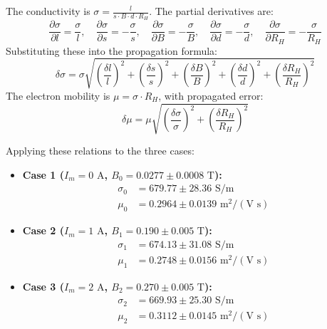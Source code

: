\documentclass[a4paper,11pt]{article}
\begin{document}
The conductivity is $\sigma = \frac{l}{s \cdot B \cdot d \cdot R_H}$. The partial derivatives are:
\begin{equation}
    \frac{\partial \sigma}{\partial l} = \frac{\sigma}{l}, \quad \frac{\partial \sigma}{\partial s} = -\frac{\sigma}{s}, \quad \frac{\partial \sigma}{\partial B} = -\frac{\sigma}{B}, \quad \frac{\partial \sigma}{\partial d} = -\frac{\sigma}{d}, \quad \frac{\partial \sigma}{\partial R_H} = -\frac{\sigma}{R_H}
\end{equation}
Substituting these into the propagation formula:
\begin{equation}
    \delta \sigma = \sigma \sqrt{\left(\frac{\delta l}{l}\right)^2 + \left(\frac{\delta s}{s}\right)^2 + \left(\frac{\delta B}{B}\right)^2 + \left(\frac{\delta d}{d}\right)^2 + \left(\frac{\delta R_H}{R_H}\right)^2}
\end{equation}
The electron mobility is $\mu = \sigma \cdot R_H$, with propagated error:
\begin{equation}
    \delta \mu = \mu \sqrt{\left(\frac{\delta \sigma}{\sigma}\right)^2 + \left(\frac{\delta R_H}{R_H}\right)^2}
\end{equation}

Applying these relations to the three cases:
\begin{itemize}
    \item {\bf Case 1 ($I_m = 0\text{ A}$, $B_0 = 0.0277 \pm 0.0008\text{ T}$):}
    \begin{align*}
        \sigma_0 &= 679.77 \pm 28.36\text{ S/m} \\
        \mu_0 &= 0.2964 \pm 0.0139\text{ m}^2/(\text{V s})
    \end{align*}
    
    \item {\bf Case 2 ($I_m = 1\text{ A}$, $B_1 = 0.190 \pm 0.005\text{ T}$):}
    \begin{align*}
        \sigma_1 &= 674.13 \pm 31.08\text{ S/m} \\
        \mu_1 &= 0.2748 \pm 0.0156\text{ m}^2/(\text{V s})
    \end{align*}
    
    \item {\bf Case 3 ($I_m = 2\text{ A}$, $B_2 = 0.270 \pm 0.005\text{ T}$):}
    \begin{align*}
        \sigma_2 &= 669.93 \pm 25.30\text{ S/m} \\
        \mu_2 &= 0.3112 \pm 0.0145\text{ m}^2/(\text{V s})
    \end{align*}
\end{itemize}
\end{document}
